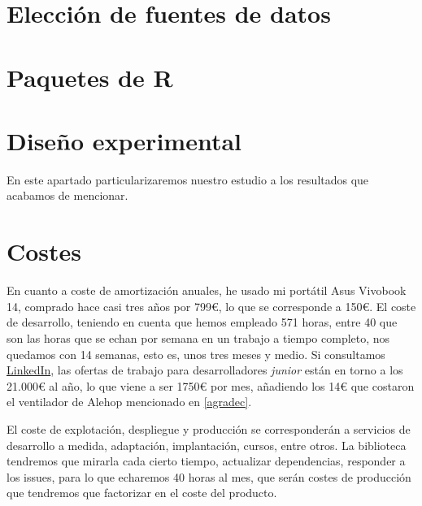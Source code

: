 \section{Elección de fuentes de datos}

\section{Paquetes de R}

\section{Diseño experimental}
En este apartado particularizaremos nuestro estudio a los resultados que acabamos de mencionar. 





\section{Costes}
En cuanto a coste de amortización anuales, he usado mi portátil Asus Vivobook 14, comprado hace casi tres 
años por 799€, lo que se corresponde a 150€. El coste de desarrollo, teniendo en cuenta que 
hemos empleado 571 horas, entre 40 que son las horas que se echan por semana en un trabajo a 
tiempo completo, nos quedamos con 14 semanas, esto es, unos tres meses y medio. Si consultamos 
\href{https://www.linkedin.com/feed/}{LinkedIn}, las ofertas de trabajo para desarrolladores 
\textit{junior} están en torno a los 21.000€ al año, lo que viene a ser 1750€ por mes, añadiendo los 14€ 
que costaron el ventilador de Alehop mencionado en \ref{agradec}.

El coste 
de explotación, despliegue y producción se corresponderán a servicios de 
desarrollo a medida, adaptación, implantación, cursos, entre otros. La biblioteca tendremos que 
mirarla cada cierto tiempo, actualizar dependencias, responder a los issues, para lo que echaremos 
40 horas al mes, que serán costes de producción que tendremos que factorizar en el coste del producto.
